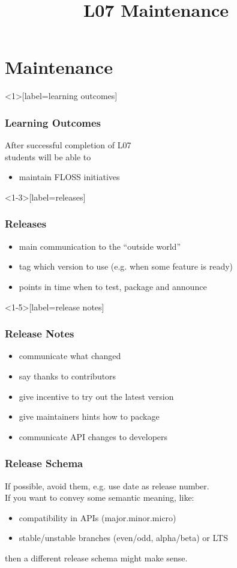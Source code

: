 

\title{L07 Maintenance}



\section{Maintenance}

\begin{frame}<1>[label=learning outcomes]
	\frametitle{Learning Outcomes}
	After successful completion of L07 \\
	students will be able to

	\begin{itemize}
	\item maintain FLOSS initiatives
	\end{itemize}
\end{frame}

\begin{frame}<1-3>[label=releases]
	\frametitle{Releases}

	\begin{itemize}[<+-| alert@+>]
	\item main communication to the ``outside world''
	\item tag which version to use (e.g. when some feature is ready)
	\item points in time when to test, package and announce
	\end{itemize}
\end{frame}

\begin{frame}<1-5>[label=release notes]
	\frametitle{Release Notes}

	\begin{itemize}[<+-| alert@+>]
	\item communicate what changed
	\item say thanks to contributors
	\item give incentive to try out the latest version
	\item give maintainers hints how to package
	\item communicate API changes to developers
	\end{itemize}
\end{frame}

\begin{frame}
	\frametitle{Release Schema}

	If possible, avoid them, e.g. use date as release number. \\
	If you want to convey some semantic meaning, like:

	\begin{itemize}[<+-| alert@+>]
	\item compatibility in APIs (major.minor.micro)
	\item stable/unstable branches (even/odd, alpha/beta) or LTS
	\end{itemize}

	\pause[\thebeamerpauses]  %

	then a different release schema might make sense.
\end{frame}

